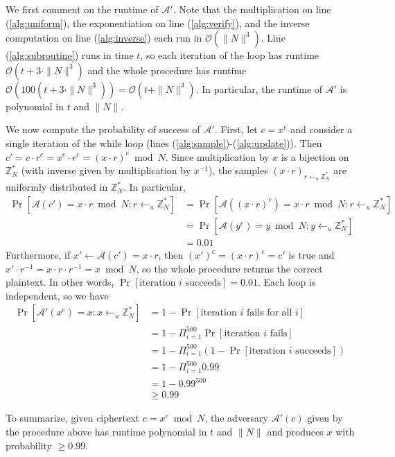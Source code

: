 \documentclass[12pt]{article}
\numberwithin{equation}{section}
\theoremstyle{plain}
\DeclareMathOperator*{\prob}{Pr}
\newcommand{\adv}{\mathcal{A}}
\newcommand{\advv}{\mathcal{A}'}
\begin{document}
We first comment on the runtime of $\advv$.
Note that the multiplication on line (\ref{alg:uniform}),
the exponentiation on line (\ref{alg:verify}),
and the inverse computation on line (\ref{alg:inverse})
each run in $\mathcal{O}(\|N\|^3)$.
Line (\ref{alg:subroutine}) runs in time $t$,
so each iteration of the loop has runtime $\mathcal{O}(t + 3 \cdot \|N\|^3)$
and the whole procedure has runtime $\mathcal{O}(100 (t + 3 \cdot \|N\|^3)) = \mathcal{O}(t + \|N\|^3)$.
In particular, the runtime of $\advv$ is polynomial in $t$ and $\| N \|$.

We now compute the probability of success of $\advv$.
First, let $c = x^e$ and consider a single iteration of the while loop (lines (\ref{alg:sample})-(\ref{alg:update})).
Then $c' = c \cdot r^e = x^e \cdot r^e = (x \cdot r)^e \bmod N$.
Since multiplication by $x$ is a bijection on $\mathbb{Z}^*_N$ (with inverse given by multiplication by $x^{-1}$),
the samples $(x \cdot r)_{r \gets_u \mathbb{Z}^*_N}$ are uniformly distributed in $\mathbb{Z}^*_N$.
In particular,
\begin{align*}
    \prob[\adv(c') = x \cdot r \bmod N : r \gets_u \mathbb{Z}^*_N]
        &= \prob[\adv((x \cdot r)^e) = x \cdot r \bmod N : r \gets_u \mathbb{Z}^*_N]\\
        &= \prob[\adv(y^e) = y \bmod N : y \gets_u \mathbb{Z}^*_N]\\
        &= 0.01
\end{align*}
Furthermore, if $x' \gets \adv(c') = x \cdot r$, then $(x')^e = (x \cdot r)^e = c'$ is true
and $x' \cdot r^{-1} = x \cdot r \cdot r^{-1} = x \bmod N$, so the whole procedure returns the correct plaintext.
In other words, $\prob[\text{iteration }i\text{ succeeds}] = 0.01$.
Each loop is independent, so we have
\begin{align*}
    \prob[\advv(x^e) = x : x \gets_u \mathbb{Z}^*_N]
        &= 1 - \prob[\text{iteration }i\text{ fails for all }i]\\
        &= 1 - \Pi_{i = 1}^{500} \prob[\text{iteration }i\text{ fails}]\\
        &= 1 - \Pi_{i = 1}^{500} (1 - \prob[\text{iteration }i\text{ succeeds}])\\
        &= 1 - \Pi_{i = 1}^{500} 0.99\\
        &= 1 - 0.99^{500}\\
        &\geq 0.99
\end{align*}

To summarize, given ciphertext $c = x^e \bmod N$, the adversary $\advv(c)$ given by the procedure above
has runtime polynomial in $t$ and $\|N\|$
and produces $x$ with probability $\geq 0.99$.
\end{document}
